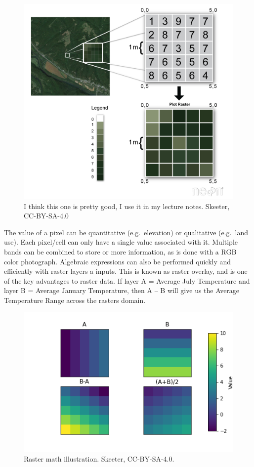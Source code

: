 \documentclass[
]{book}
\begin{document}
\begin{figure}
\includegraphics[width=0.75\linewidth]{images/03-raster-example} \caption{I think this one is pretty good, I use it in my lecture notes. Skeeter, CC-BY-SA-4.0}\label{fig:3-raster-example}
\end{figure}

The value of a pixel can be quantitative (e.g.~elevation) or qualitative (e.g.~land use). Each pixel/cell can only have a single value associated with it. Multiple bands can be combined to store or more information, as is done with a RGB color photograph. Algebraic expressions can also be performed quickly and efficiently with raster layers a inputs. This is known as raster overlay, and is one of the key advantages to raster data. If layer A = Average July Temperature and layer B = Average January Temperature, then A -- B will give us the Average Temperature Range across the rasters domain.

\begin{figure}
\includegraphics[width=0.75\linewidth]{images/03-raster-overlay} \caption{Raster math illustration. Skeeter, CC-BY-SA-4.0.}\label{fig:3-raster-overlay}
\end{figure}
\end{document}
